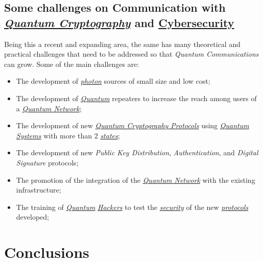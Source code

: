 \documentclass[conference]{IEEEtran}
\begin{document}
\newpage

\subsection{Some challenges on Communication with \\\href{https://en.wikipedia.org/wiki/Quantum_cryptography}{\textit{Quantum Cryptography}} and \href{https://en.wikipedia.org/wiki/Computer_security}{Cybersecurity}}

Being this a recent and expanding area, the same has many theoretical and practical challenges that need to be addressed so that \textit{Quantum Communications} can grow. Some of the main challenges are:

\begin{itemize}
    \item The development of \href{https://en.wikipedia.org/wiki/Photon}{\textit{photon}} sources of small size and low cost;
    \item The development of \href{https://en.wikipedia.org/wiki/Quantum}{\textit{Quantum}} repeaters to increase the reach among users of a \href{https://en.wikipedia.org/wiki/Quantum_network}{\textit{Quantum Network}};
    \item The development of new \href{https://en.wikipedia.org/wiki/List_of_quantum_key_distribution_protocols}{\textit{Quantum Cryptography Protocols}} using \href{https://en.wikipedia.org/wiki/Quantum_system}{\textit{Quantum Systems}} with more than 2 \href{https://en.wikipedia.org/wiki/Quantum_state}{\textit{states}};
    \item The development of new \textit{Public Key Distribution}, \textit{Authentication}, and \textit{Digital Signature} protocols;
    \item The promotion of the integration of the \href{https://en.wikipedia.org/wiki/Quantum_network}{\textit{Quantum Network}} with the existing infrastructure;
    \item The training of \href{https://en.wikipedia.org/wiki/Quantum}{\textit{Quantum}} \href{https://en.wikipedia.org/wiki/Hacker}{\textit{Hackers}} to test the \href{https://en.wikipedia.org/wiki/Internet_security}{\textit{security}} of the new \href{https://en.wikipedia.org/wiki/Cryptographic_protocol}{\textit{protocols}} developed;
\end{itemize}

\vspace{6pt}

\section*{Conclusions}
\end{document}
